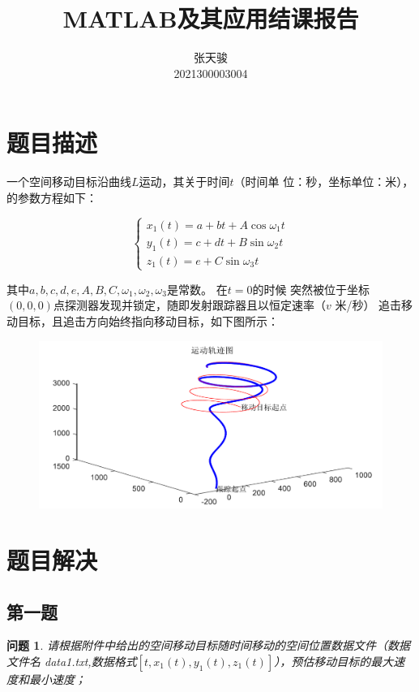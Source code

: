 \documentclass[a4paper, 12pt]{ctexart}
\author{张天骏 \\ 2021300003004}
\date{}
\title{MATLAB及其应用结课报告}
\newtheorem*{example}{问题}
\begin{document}
\maketitle

\section{题目描述}

一个空间移动目标沿曲线$L$运动，其关于时间$t$（时间单
位：秒，坐标单位：米），的参数方程如下：

$$\begin{cases}
    x_1(t)=a+bt+A\cos \omega_1 t \\
    y_1(t)=c+dt+B\sin \omega_2 t \\
    z_1(t)=e+C\sin \omega_3 t
\end{cases}$$

其中$a,b,c,d,e,A,B,C,\omega_1,\omega_2,\omega_3$是常数。
在$t=0$的时候
突然被位于坐标$(0,0,0)$点探测器发现并锁定，随即发射跟踪器且以恒定速率（$v$ 米/秒）
追击移动目标，且追击方向始终指向移动目标，如下图所示：

\begin{figure}[h]
    \centering
    \includegraphics[width=0.8\linewidth]{pic/1.png}
\end{figure}


\section{题目解决}

\subsection{第一题}

\begin{example}
    请根据附件中给出的空间移动目标随时间移动的空间位置数据文件（数据文件名
    data1.txt,数据格式$[t,x_1(t),y_1(t),z_1(t)]$），预估移动目标的最大速度和最小速度；
\end{example}
\end{document}
